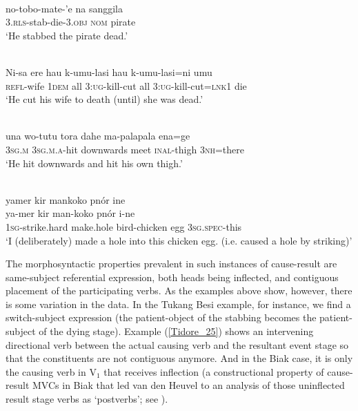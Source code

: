 \ea \label{TUKANG001a}
\\
\gll no-tobo-mate-'e na sanggila \\
\textsc{3}.\textsc{rls}-stab-die-\textsc{3}.\textsc{obj} \textsc{nom} pirate \\
\glft `He stabbed the pirate dead.'\\ 
\z

\ea \label{Makalero_47}
\\
\gll Ni-sa ere hau k-umu-lasi hau k-umu-lasi=ni umu \\
\textsc{refl}-wife 1\textsc{dem} all 3:\textsc{ug}-kill-cut all 3:\textsc{ug}-kill-cut=\textsc{lnk}1 die \\
\glft `He cut his wife to death (until) she was dead.’\\ 
\z

\ea \label{Tidore_25}
\\
\gll una wo-tutu tora dahe ma-palapala ena=ge \\
3\textsc{sg}.\textsc{m} 3\textsc{sg}.\textsc{m}.\textsc{a}-hit downwards meet \textsc{inal}-thigh 3\textsc{nh}=there \\
\glft `He hit downwards and hit his own thigh.'\\
\z

\ea \label{Biak002}
\\
\glll yamer kir mankoko pnór ine \\
ya-mer kir man-koko pnór i-ne \\
\textsc{1}\textsc{sg}-strike.hard make.hole bird-chicken egg \textsc{3}\textsc{sg}.\textsc{spec}-this \\
\glft `I (deliberately) made a hole into this chicken egg. (i.e. caused a hole by striking)'\\ 
\z

The morphosyntactic properties prevalent in such instances of cause-result are same-subject referential expression, both heads being inflected, and contiguous placement of the participating verbs. As the examples above show, however, there is some variation in the data. In the Tukang Besi example, for instance, we find a switch-subject expression (the patient-object of the stabbing becomes the patient-subject of the dying stage). Example (\ref{Tidore_25}) shows an intervening directional verb between the actual causing verb and the resultant event stage so that the constituents are not contiguous anymore. And in the Biak case, it is only the causing verb in V$_1$ that receives inflection (a constructional property of cause-result MVCs in Biak that led van den Heuvel to an analysis of those uninflected result stage verbs as `postverbs'; see \citealt[187]{vanheuvel2006}).

